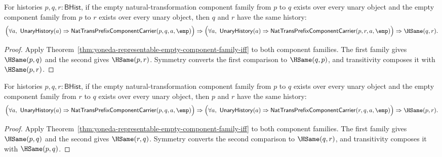 \begin{theorem}
\label{thm:yoneda-representable-empty-component-family-target-deterministic}
For histories $p,q,r:\mathsf{BHist}$, if the empty natural-transformation
component family from $p$ to $q$ exists over every unary object and the empty
component family from $p$ to $r$ exists over every unary object, then $q$ and
$r$ have the same history:
$$
\Bigl(\forall a,\ \mathsf{UnaryHistory}(a)\Rightarrow
\mathsf{NatTransPrefixComponentCarrier}(p,q,a,\emp)\Bigr)\Rightarrow
\Bigl(\forall a,\ \mathsf{UnaryHistory}(a)\Rightarrow
\mathsf{NatTransPrefixComponentCarrier}(p,r,a,\emp)\Bigr)\Rightarrow
\HSame(q,r).
$$
\end{theorem}
\begin{proof}
Apply Theorem~\ref{thm:yoneda-representable-empty-component-family-iff} to
both component families. The first family gives $\HSame(p,q)$ and the second
gives $\HSame(p,r)$. Symmetry converts the first comparison to
$\HSame(q,p)$, and transitivity composes it with $\HSame(p,r)$.
\end{proof}

\begin{theorem}
\label{thm:yoneda-representable-empty-component-family-source-deterministic}
For histories $p,q,r:\mathsf{BHist}$, if the empty natural-transformation
component family from $p$ to $q$ exists over every unary object and the empty
component family from $r$ to $q$ exists over every unary object, then $p$ and
$r$ have the same history:
$$
\Bigl(\forall a,\ \mathsf{UnaryHistory}(a)\Rightarrow
\mathsf{NatTransPrefixComponentCarrier}(p,q,a,\emp)\Bigr)\Rightarrow
\Bigl(\forall a,\ \mathsf{UnaryHistory}(a)\Rightarrow
\mathsf{NatTransPrefixComponentCarrier}(r,q,a,\emp)\Bigr)\Rightarrow
\HSame(p,r).
$$
\end{theorem}
\begin{proof}
Apply Theorem~\ref{thm:yoneda-representable-empty-component-family-iff} to
both component families. The first family gives $\HSame(p,q)$ and the second
gives $\HSame(r,q)$. Symmetry converts the second comparison to
$\HSame(q,r)$, and transitivity composes it with $\HSame(p,q)$.
\end{proof}

